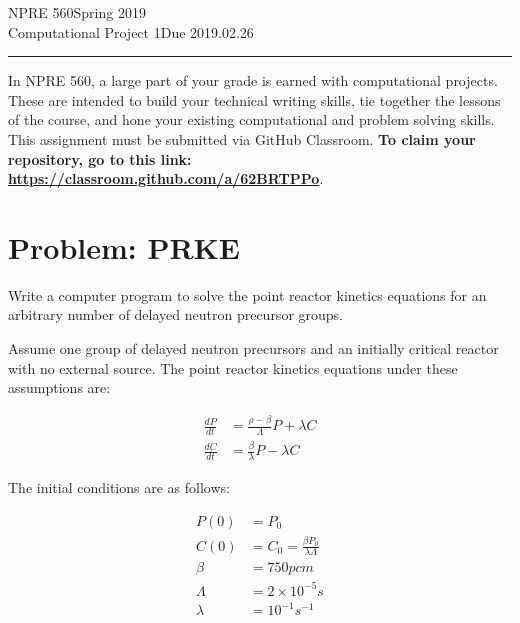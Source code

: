 \documentclass{article}
\newcommand{\class}{NPRE 560}
\newcommand{\term}{Spring 2019}
\newcommand{\assignment}{Computational Project 1}
\newcommand{\duedate}{2019.02.26}
\begin{document}
 


\class \hfill \term \\
\assignment \hfill Due \duedate\\
\rule[1ex]{\textwidth}{.1pt}


In \class, a large part of your grade is earned with computational projects. 
These are intended to build your technical writing skills, tie together the 
lessons of the course, and hone your existing computational and problem solving 
skills. This assignment must be submitted via GitHub Classroom. \textbf{To claim your 
repository, go to this link: \url{https://classroom.github.com/a/62BRTPPo}}.

\section{Problem: PRKE}

Write a computer program to solve the point reactor kinetics equations for an 
arbitrary number of delayed neutron precursor groups.  

Assume one group of delayed neutron precursors and an initially critical 
                reactor with no external source. The point reactor kinetics 
                equations under these assumptions are:

\begin{align}
        \frac{dP}{dt} &= \frac{\rho - \beta}{\Lambda}P + \lambda C\\
        \frac{dC}{dt} &= \frac{\beta}{\lambda}P - \lambda C
\end{align}

The initial conditions are as follows:

\begin{align}
        P(0) &=P_0\\
        C(0) &= C_0 = \frac{\beta P_0}{\lambda\Lambda}\\
        \beta &= 750pcm\\
        \Lambda &= 2\times 10^{-5}s\\
        \lambda &= 10^{-1}s^{-1}
\end{align}
\end{document}
